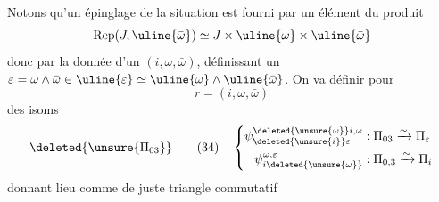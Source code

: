 Notons qu'un épinglage de la situation est fourni par un élément du produit
\[
\operatorname{Rep}(J,\uline{\bar\omega})\simeq J\times\uline{\omega}\times\uline{\bar\omega}
\]
donc par la donnée d'un $(i,\omega,\bar\omega)$, définissant  un $\varepsilon=\omega\wedge\bar\omega\in\uline{\varepsilon}\simeq\uline{\omega}\wedge\uline{\bar\omega}$. On va définir pour
\[
r=(i,\omega,\bar\omega)
\]
des isoms
\[
\deleted{\unsure{\Pi_{03}}}\qquad(34)\quad\left\{\begin{aligned}
\psi_{\deleted{\unsure{i}}\varepsilon}^{\deleted{\unsure{\omega}}i,\omega}&:\Pi_{03}\xrightarrow{\sim}\Pi_\varepsilon\\
\psi_{i\deleted{\unsure{\omega}}}^{\omega,\varepsilon}&:\Pi_{0,3}\xrightarrow{\sim}\Pi_i
\end{aligned}\right.
\]
donnant lieu comme de juste  triangle commutatif

